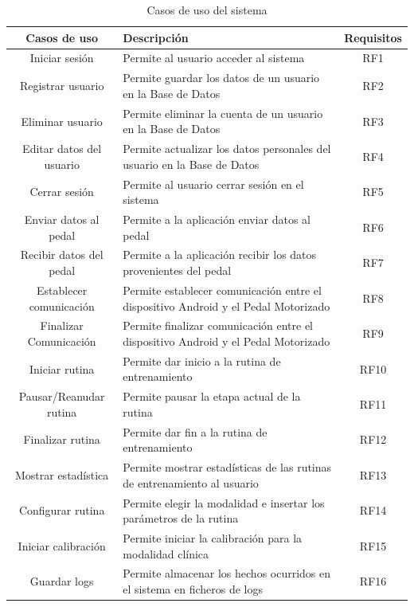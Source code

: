 \begin{table}[h]
    \centering
    \begin{tabularx}{\textwidth}{|c|X|c|}
        \hline
        \textbf{Casos de uso} & \textbf{Descripción} & \textbf{Requisitos}\\\hline
        Iniciar sesión & Permite al usuario acceder al sistema & RF1\\\hline
        Registrar usuario & Permite guardar los datos de un usuario en la Base de Datos & RF2\\\hline
        Eliminar usuario & Permite eliminar la cuenta de un usuario en la Base de Datos & RF3\\\hline
        Editar datos del usuario & Permite actualizar los datos personales del usuario en la Base de Datos & RF4\\\hline
        Cerrar sesión & Permite al usuario cerrar sesión en el sistema & RF5\\\hline
        Enviar datos al pedal & Permite a la aplicación enviar datos al pedal & RF6 \\\hline
        Recibir datos del pedal & Permite a la aplicación recibir los datos provenientes del pedal & RF7\\\hline
        Establecer comunicación & Permite establecer comunicación entre el dispositivo Android y el Pedal Motorizado & RF8\\\hline
        Finalizar Comunicación & Permite finalizar comunicación entre el dispositivo Android y el Pedal Motorizado & RF9\\\hline
        Iniciar rutina & Permite dar inicio a la rutina de entrenamiento & RF10\\\hline
        Pausar/Reanudar rutina & Permite pausar la etapa actual de la rutina & RF11\\\hline
        Finalizar rutina & Permite dar fin a la rutina de entrenamiento & RF12\\\hline
        Mostrar estadística & Permite mostrar estadísticas de las rutinas de entrenamiento  al usuario& RF13\\\hline
        Configurar rutina & Permite elegir la modalidad e insertar los parámetros de la rutina  & RF14\\\hline
        Iniciar calibración & Permite iniciar la calibración para la modalidad clínica  & RF15\\\hline
        Guardar logs & Permite almacenar los hechos ocurridos en el sistema en ficheros de logs & RF16\\\hline
    \end{tabularx}
    \label{tab: rf}
    \caption{Casos de uso del sistema}
\end{table}
    
